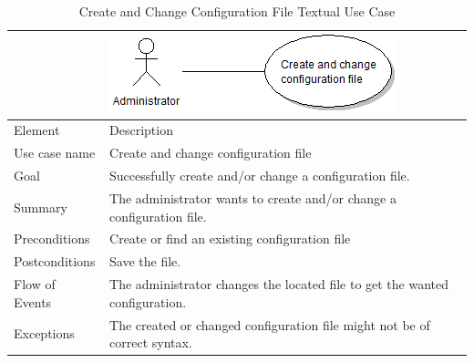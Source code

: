 \begin{table}[htbp] \footnotesize \center
\caption{Create and Change Configuration File Textual Use Case\label{tab:textual:configure}}
\begin{tabularx}{\textwidth}{l X}
	 & \includegraphics[scale=0.8]{./planning/img/uc_configurate} \\
	\toprule
	Element & Description\\
	\midrule
	Use case name & Create and change configuration file\\
	Goal & Successfully create and/or change a configuration file. \\
	Summary & The administrator wants to create and/or change a configuration file. \\
	Preconditions & Create or find an existing configuration file \\
	Postconditions & Save the file.\\
	\midrule
	Flow of Events & The administrator changes the located file to get the wanted configuration.  \\
	\midrule
	Exceptions & The created or changed configuration file might not be of correct syntax. \\
	\bottomrule
\end{tabularx}
\end{table}

